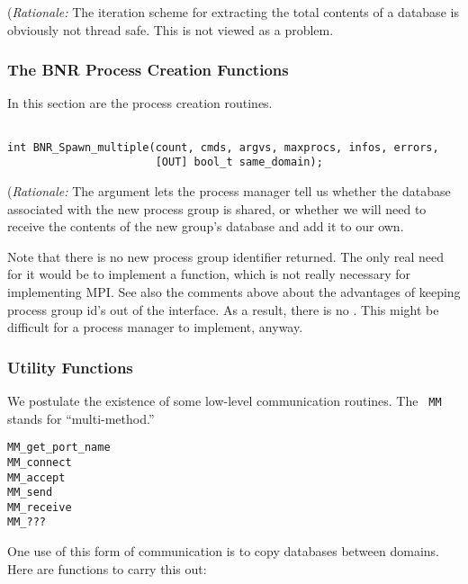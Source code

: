 \documentclass{article}
\begin{document}
({\em Rationale:\/}  The iteration scheme for extracting the total contents
of a database is obviously not thread safe.  This is not viewed as a problem.

\subsubsection{The BNR Process Creation Functions}
\label{sec:bnr-spawn}

In this section are the process creation routines.

\begin{verbatim}

int BNR_Spawn_multiple(count, cmds, argvs, maxprocs, infos, errors,
                       [OUT] bool_t same_domain);
\end{verbatim}

({\em Rationale:\/}  The  argument lets the process manager
tell us whether the database associated with the new process group is shared,
or whether we will need to receive the contents of the new group's database
and add it to our own.

Note that there is no new process group identifier returned.  The only real
need for it would be to implement a  function, which is not
really necessary for implementing MPI.  See also the comments above about the
advantages of keeping process group id's out of the interface.  As a result,
there is no .  This might be difficult for a process manager to
implement, anyway. 

\subsubsection{Utility Functions}

We postulate the existence of some low-level communication routines.  The {\tt
  MM} stands for ``multi-method.''

\begin{verbatim}
MM_get_port_name
MM_connect
MM_accept
MM_send
MM_receive
MM_???
\end{verbatim}

One use of this form of communication is to copy databases between domains.
Here are functions to carry this out:
\end{document}
